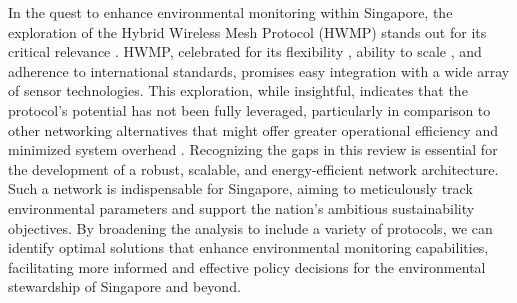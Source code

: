 

In the quest to enhance environmental monitoring within Singapore, the exploration of the Hybrid Wireless Mesh Protocol (HWMP) stands out for its critical relevance \cite{Yang_Ma_Miao_2009}. HWMP, celebrated for its flexibility \cite{4428721}, ability to scale \cite{5409759}, and adherence to international standards, promises easy integration with a wide array of sensor technologies. This exploration, while insightful, indicates that the protocol's potential has not been fully leveraged, particularly in comparison to other networking alternatives that might offer greater operational efficiency and minimized system overhead \cite{nmk2013}. Recognizing the gaps in this review is essential for the development of a robust, scalable, and energy-efficient network architecture. Such a network is indispensable for Singapore, aiming to meticulously track environmental parameters and support the nation's ambitious sustainability objectives. By broadening the analysis to include a variety of protocols, we can identify optimal solutions that enhance environmental monitoring capabilities, facilitating more informed and effective policy decisions for the environmental stewardship of Singapore and beyond.

